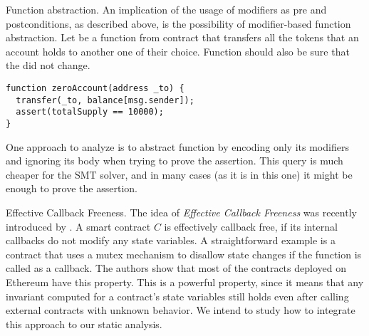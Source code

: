 \begin{paragraph}{Function abstraction.}
An implication of the usage of modifiers as pre and postconditions, as
described above, is the possibility of modifier-based function abstraction.
%
Let  be a function from contract  that transfers
all the tokens that an account holds to another one of their choice.
%
Function  should also be sure that the  did
not change.

\begin{verbatim}
function zeroAccount(address _to) {
  transfer(_to, balance[msg.sender]);
  assert(totalSupply == 10000);
}
\end{verbatim}

One approach to analyze  is to abstract function
 by encoding only its modifiers and ignoring its body when
trying to prove the assertion.
%
This query is much cheaper for the SMT solver, and in many cases (as it is in
this one) it might be enough to prove the assertion.
\end{paragraph}

\begin{paragraph}{Effective Callback Freeness.}
The idea of \emph{Effective Callback Freeness} was recently introduced by
\cite{Grossman}.
%
A smart contract $C$ is effectively callback free, if its internal callbacks do
not modify any state variables.
%
A straightforward example is a contract that uses a mutex mechanism to disallow
state changes if the function is called as a callback.
%
The authors show that most of the contracts deployed on Ethereum have this
property.
%
This is a powerful property, since it means that any invariant computed for a
contract's state variables still holds even after calling external contracts
with unknown behavior.
%
We intend to study how to integrate this approach to our static analysis.
\end{paragraph}

